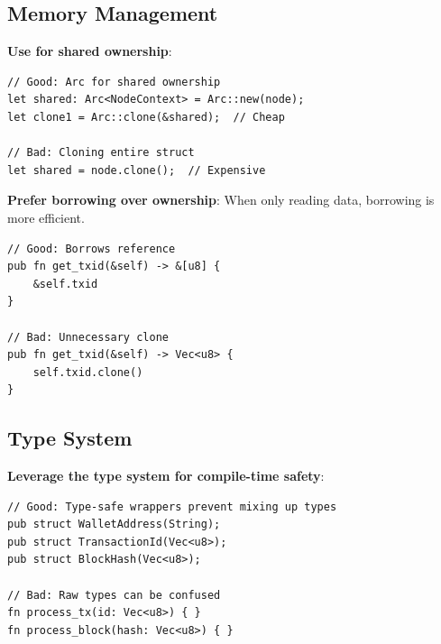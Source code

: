 \subsection{Memory Management}
\label{subsec:ch24-best-memory}

\textbf{Use  for shared ownership}:

\begin{listing}[H]
\caption{Arc for shared ownership}
\label{lst:ch24-best-arc}
\begin{verbatim}
// Good: Arc for shared ownership
let shared: Arc<NodeContext> = Arc::new(node);
let clone1 = Arc::clone(&shared);  // Cheap

// Bad: Cloning entire struct
let shared = node.clone();  // Expensive
\end{verbatim}
\end{listing}

\textbf{Prefer borrowing over ownership}: When only reading data, borrowing is more efficient.

\begin{listing}[H]
\caption{Borrowing best practice}
\label{lst:ch24-best-borrow}
\begin{verbatim}
// Good: Borrows reference
pub fn get_txid(&self) -> &[u8] {
    &self.txid
}

// Bad: Unnecessary clone
pub fn get_txid(&self) -> Vec<u8> {
    self.txid.clone()
}
\end{verbatim}
\end{listing}

\subsection{Type System}
\label{subsec:ch24-best-types}

\textbf{Leverage the type system for compile-time safety}:

\begin{listing}[H]
\caption{Type-safe wrappers}
\label{lst:ch24-best-types}
\begin{verbatim}
// Good: Type-safe wrappers prevent mixing up types
pub struct WalletAddress(String);
pub struct TransactionId(Vec<u8>);
pub struct BlockHash(Vec<u8>);

// Bad: Raw types can be confused
fn process_tx(id: Vec<u8>) { }
fn process_block(hash: Vec<u8>) { }
\end{verbatim}
\end{listing}

